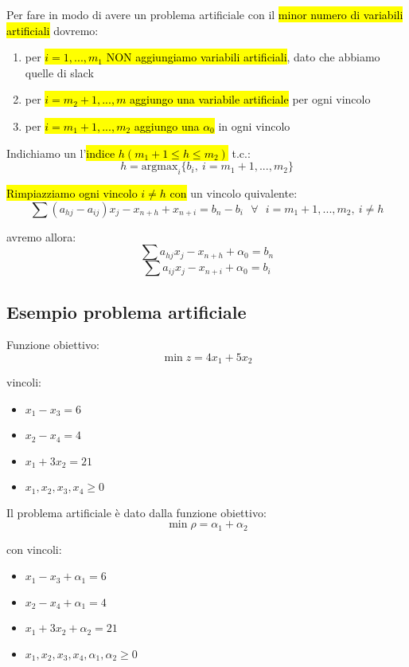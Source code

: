 Per fare in modo di avere un problema artificiale con il \hl{minor numero di variabili artificiali} dovremo:

\begin{enumerate}
	\item per \hl{$i = 1, ..., m_1$ NON aggiungiamo variabili artificiali}, dato che abbiamo quelle di slack
	\item per \hl{$i = m_2 + 1, ..., m$ aggiungo una variabile artificiale} per ogni vincolo
	\item per \hl{$i = m_1 + 1, ..., m_2$ aggiungo una $\alpha_0$} in ogni vincolo
\end{enumerate}

Indichiamo un l'\hl{indice $h(m_1+1 \leq h \leq m_2)$} t.c.:
$$h = \text{argmax}_i\{b_i,\ i = m_1+1, ..., m_2\}$$

\hl{Rimpiazziamo ogni vincolo $i \neq h$ con} un vincolo quivalente:
$$\sum (a_{hj} - a_{ij})x_j - x_{n+h} + x_{n+i} = b_n - b_i\ \ \ \forall\ \ \ i = m_1 + 1, ..., m_2,\ i \neq h$$

avremo allora:
$$\sum a_{hj}x_j - x_{n+h} + \alpha_0 = b_n$$
$$\sum a_{ij}x_j - x_{n+i} + \alpha_0 = b_i$$


\subsection{Esempio problema artificiale}

Funzione obiettivo:
$$\min z = 4x_1 + 5x_2$$

vincoli:

\begin{itemize}
	\item $x_1 - x_3 = 6$
	\item $x_2 - x_4 = 4$
	\item $x_1 + 3x_2 = 21$
	\item $x_1, x_2, x_3, x_4 \geq 0$
\end{itemize}

Il problema artificiale è dato dalla funzione obiettivo:
$$\min \rho = \alpha_1 + \alpha_2$$

con vincoli:

\begin{itemize}
	\item $x_1 - x_3 + \alpha_1 = 6$
	\item $x_2 - x_4 + \alpha_1 = 4$
	\item $x_1 + 3x_2 + \alpha_2 = 21$
	\item $x_1, x_2, x_3, x_4, \alpha_1, \alpha_2 \geq 0$
\end{itemize}

